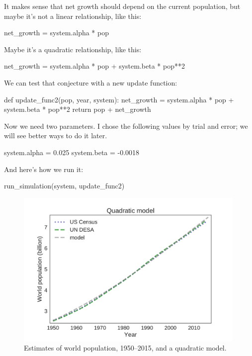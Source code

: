\documentclass[12pt]{book}
\theoremstyle{exercise}
\begin{document}
It makes sense that net growth should depend on the current population, but maybe it's not a linear relationship, like this:

\begin{python}
    net_growth = system.alpha * pop
\end{python}

Maybe it's a quadratic relationship, like this:

\begin{python}
    net_growth = system.alpha * pop + system.beta * pop**2
\end{python}

We can test that conjecture with a new update function:

\begin{python}
def update_func2(pop, year, system):
    net_growth = system.alpha * pop + system.beta * pop**2
    return pop + net_growth
\end{python}

Now we need two parameters.  I chose the following values by trial and error; we will see better ways to do it later.

\begin{python}
system.alpha = 0.025
system.beta = -0.0018
\end{python}

And here's how we run it:

\begin{python}
run_simulation(system, update_func2)
\end{python}

\begin{figure}
\centerline{\includegraphics[height=3in]{figs/chap03-fig04.pdf}}
\caption{Estimates of world population, 1950--2015, and a quadratic model.}
\label{chap03-fig04}
\end{figure}
\end{document}
